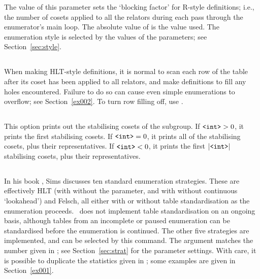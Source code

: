The value of this parameter sets the `blocking factor' for R-style
  definitions; i.e., the number of cosets applied to all the relators
  during each pass through the enumerator's main loop.
The absolute value of  is the value used.
The enumeration style is selected by the values of the  \amp
   parameters; see Section~\ref{sec:style}.

\subsection{}

When making HLT-style definitions, it is normal to scan each row of the
  table after its coset has been applied to all relators, and make 
  definitions to fill any holes encountered.
Failure to do so can cause even simple enumerations to overflow; see
  Section~\ref{ex002}.
To turn row filling off, use .
  
\subsection{}

This option prints out the stabilising cosets of the subgroup.
If $\texttt{<int>} > 0$, it prints the first  stabilising cosets.
If $\texttt{<int>} = 0$, it prints all of the stabilising cosets, plus their
  representatives.
If $\texttt{<int>} < 0$, it prints the first $|\texttt{<int>}|$ stabilising cosets,
  plus their representatives.

\subsection{}

In his book \cite{Sim}, Sims discusses ten standard enumeration
  strategies.
These are effectively HLT (with \amp without the  parameter,
  and with \amp without continuous `lookahead') and Felsch, all either with
  or without table standardisation as the enumeration proceeds.
\ace\ does not implement table standardisation on an ongoing basis, 
  although tables from an incomplete or paused enumeration can be 
  standardised before the enumeration is continued.
The other five strategies are implemented, and can be selected by this
  command.
The argument matches the number given in \cite[\S5.5]{Sim}; see
  Section~\ref{sec:strat} for the parameter settings.
With care, it is possible to duplicate the statistics given in \cite{Sim};
  some examples are given in Section~\ref{ex001}.

